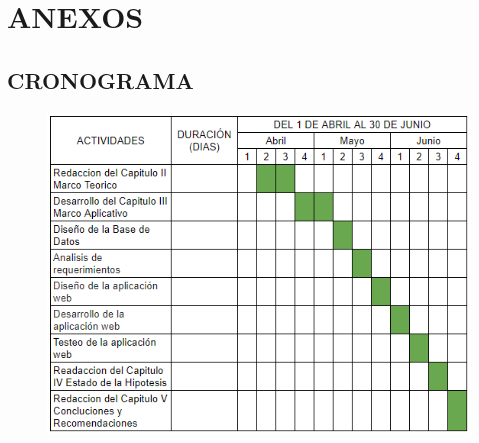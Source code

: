 \chapter{ANEXOS}
    \section{CRONOGRAMA}

    \begin{figure}[H]
        \centering
        \includegraphics[scale=1.2]{imagenes/cronograma-2024.png}
    \end{figure}
    